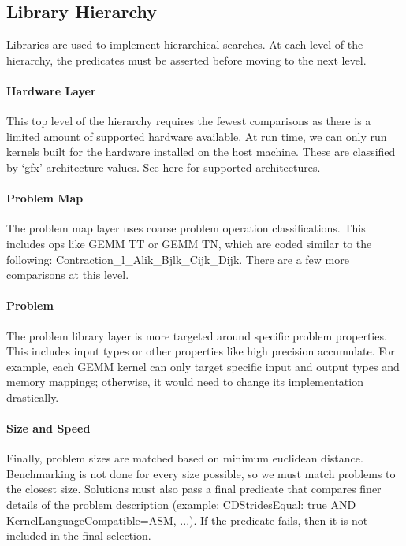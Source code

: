 \documentclass[]{article}
\begin{document}
\subsection{Library Hierarchy}

Libraries are used to implement hierarchical searches. At each level of the hierarchy, the predicates must be asserted before moving to the next level.

\paragraph{Hardware Layer}

This top level of the hierarchy requires the fewest comparisons as there is a limited amount of supported hardware available. At run time, we can only run kernels built for the hardware installed on the host machine. These are classified by `gfx' architecture values. See \href{https://github.com/ROCmSoftwarePlatform/Tensile/wiki/Languages}{here} for supported architectures.

\paragraph{Problem Map}
The problem map layer uses coarse problem operation classifications. This includes ops like GEMM TT or GEMM TN, which are coded similar to the following: Contraction\_l\_Alik\_Bjlk\_Cijk\_Dijk. There are a few more comparisons at this level.

\paragraph{Problem}

The problem library layer is more targeted around specific problem properties. This includes input types or other properties like high precision accumulate. For example, each GEMM kernel can only target specific input and output types and memory mappings; otherwise, it would need to change its implementation drastically.

\paragraph{Size and Speed}

Finally, problem sizes are matched based on minimum euclidean distance. Benchmarking is not done for every size possible, so we must match problems to the closest size. Solutions must also pass a final predicate that compares finer details of the problem description (example: CDStridesEqual: true AND KernelLanguageCompatible=ASM, ...). If the predicate fails, then it is not included in the final selection.
\end{document}
